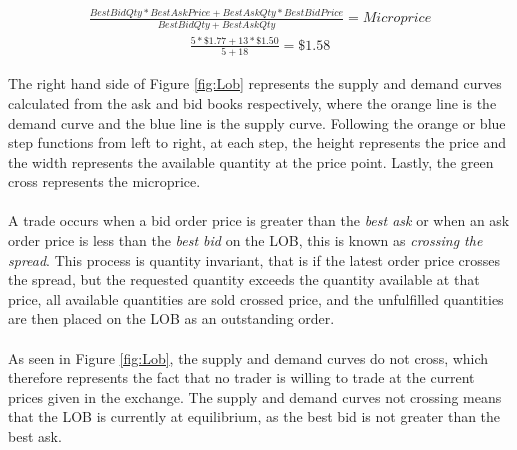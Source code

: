 \documentclass[ %
                    author={Ashwinder Khurana},
                supervisor={Prof Dave Cliff},
                    degree={MEng},
                     title={The Deeply Reinforced Trader},
                  subtitle={},
                      type={enterprise},
                      year={2020} ]{dissertation}
\begin{document}
\begin{equation}
\label{microprice}
\begin{split}
\frac{BestBidQty * BestAskPrice + BestAskQty*BestBidPrice}{ BestBidQty + BestAskQty}  = Microprice 
\end{split}
\end{equation}
\begin{equation}
\begin{split}
\frac{5*\$1.77 + 13*\$1.50}{5 + 18} = \$1.58
\end{split}
\end{equation}

\noindent
The right hand side of Figure \ref{fig:Lob} represents the supply and demand curves calculated from the ask and bid books respectively, where the orange line is the demand curve and the blue line is the supply curve.  Following the orange or blue step functions from left to right, at each step, the height represents the price and the width represents the available quantity at the price point. Lastly, the green cross represents the microprice.
\\
\\
A trade occurs when a bid order price is greater than the \textit{best ask} or when an ask order price is less than the \textit{best bid} on the LOB, this is known as \textit{crossing the spread}. This process is quantity invariant, that is if the latest order price crosses the spread, but the requested quantity exceeds the quantity available at that price, all available quantities are sold crossed price, and the unfulfilled quantities are then placed on the LOB as an outstanding order.
\\
\\
\noindent
As seen in Figure \ref{fig:Lob}, the supply and demand curves do not cross, which therefore represents the fact that no trader is willing to trade at the current prices given in the exchange. The supply and demand curves not crossing means that the LOB is currently at equilibrium, as the best bid is not greater than the best ask.
\end{document}
